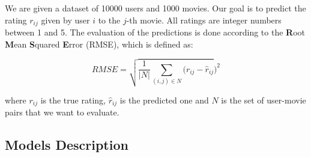 \documentclass[10pt,conference,compsocconf]{IEEEtran}
\begin{document}
We are given a dataset of 10000 users and 1000 movies. Our goal is to predict the rating $r_{ij}$ given by user $i$ to the $j$-th movie. All ratings are integer numbers between 1 and 5. The evaluation of the predictions is done according to the \textbf{R}oot \textbf{M}ean \textbf{S}quared \textbf{E}rror (RMSE), which is defined as:

$$
RMSE = \sqrt{\frac{1}{\vert N \vert} \sum_{(i,j)\in N} (r_{ij} - \hat{r}_{ij}})^2
$$

\noindent where $r_{ij}$ is the true rating, $\hat{r}_{ij}$ is the predicted one and $N$ is the set of user-movie pairs that we want to evaluate.

\subsection{Models Description}

\end{document}
